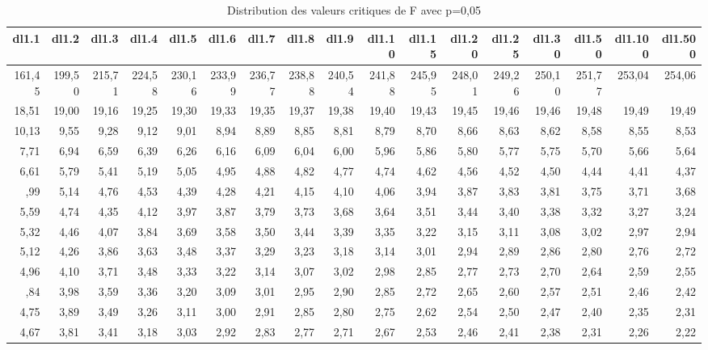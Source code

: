 \documentclass[
  11pt,
  french,
]{book}
\begin{document}
\begin{table}

\caption{\label{tab:tableCritiqueF}Distribution des valeurs critiques de F avec p=0,05}
\centering
\fontsize{8}{10}\selectfont
\begin{tabular}[t]{rrrrrrrrrrrrrrrrr}
\toprule
dl1.1 & dl1.2 & dl1.3 & dl1.4 & dl1.5 & dl1.6 & dl1.7 & dl1.8 & dl1.9 & dl1.10 & dl1.15 & dl1.20 & dl1.25 & dl1.30 & dl1.50 & dl1.100 & dl1.500\\
\midrule
161,45 & 199,50 & 215,71 & 224,58 & 230,16 & 233,99 & 236,77 & 238,88 & 240,54 & 241,88 & 245,95 & 248,01 & 249,26 & 250,10 & 251,77 & 253,04 & 254,06\\
18,51 & 19,00 & 19,16 & 19,25 & 19,30 & 19,33 & 19,35 & 19,37 & 19,38 & 19,40 & 19,43 & 19,45 & 19,46 & 19,46 & 19,48 & 19,49 & 19,49\\
10,13 & 9,55 & 9,28 & 9,12 & 9,01 & 8,94 & 8,89 & 8,85 & 8,81 & 8,79 & 8,70 & 8,66 & 8,63 & 8,62 & 8,58 & 8,55 & 8,53\\
7,71 & 6,94 & 6,59 & 6,39 & 6,26 & 6,16 & 6,09 & 6,04 & 6,00 & 5,96 & 5,86 & 5,80 & 5,77 & 5,75 & 5,70 & 5,66 & 5,64\\
6,61 & 5,79 & 5,41 & 5,19 & 5,05 & 4,95 & 4,88 & 4,82 & 4,77 & 4,74 & 4,62 & 4,56 & 4,52 & 4,50 & 4,44 & 4,41 & 4,37\\
\addlinespace
5,99 & 5,14 & 4,76 & 4,53 & 4,39 & 4,28 & 4,21 & 4,15 & 4,10 & 4,06 & 3,94 & 3,87 & 3,83 & 3,81 & 3,75 & 3,71 & 3,68\\
5,59 & 4,74 & 4,35 & 4,12 & 3,97 & 3,87 & 3,79 & 3,73 & 3,68 & 3,64 & 3,51 & 3,44 & 3,40 & 3,38 & 3,32 & 3,27 & 3,24\\
5,32 & 4,46 & 4,07 & 3,84 & 3,69 & 3,58 & 3,50 & 3,44 & 3,39 & 3,35 & 3,22 & 3,15 & 3,11 & 3,08 & 3,02 & 2,97 & 2,94\\
5,12 & 4,26 & 3,86 & 3,63 & 3,48 & 3,37 & 3,29 & 3,23 & 3,18 & 3,14 & 3,01 & 2,94 & 2,89 & 2,86 & 2,80 & 2,76 & 2,72\\
4,96 & 4,10 & 3,71 & 3,48 & 3,33 & 3,22 & 3,14 & 3,07 & 3,02 & 2,98 & 2,85 & 2,77 & 2,73 & 2,70 & 2,64 & 2,59 & 2,55\\
\addlinespace
4,84 & 3,98 & 3,59 & 3,36 & 3,20 & 3,09 & 3,01 & 2,95 & 2,90 & 2,85 & 2,72 & 2,65 & 2,60 & 2,57 & 2,51 & 2,46 & 2,42\\
4,75 & 3,89 & 3,49 & 3,26 & 3,11 & 3,00 & 2,91 & 2,85 & 2,80 & 2,75 & 2,62 & 2,54 & 2,50 & 2,47 & 2,40 & 2,35 & 2,31\\
4,67 & 3,81 & 3,41 & 3,18 & 3,03 & 2,92 & 2,83 & 2,77 & 2,71 & 2,67 & 2,53 & 2,46 & 2,41 & 2,38 & 2,31 & 2,26 & 2,22\\

\end{tabular}
\end{table}
\end{document}
